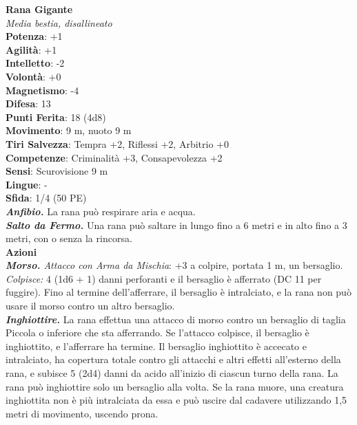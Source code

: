 \begin{multicols}{2}
\medskip\textbf{Rana Gigante}\\
\emph{Media bestia, disallineato}\\
\textbf{Potenza}: +1\\
\textbf{Agilità}: +1\\
\textbf{Intelletto}: -2\\
\textbf{Volontà}: +0\\
\textbf{Magnetismo}: -4\\
\textbf{Difesa}: 13\\
\textbf{Punti Ferita}: 18 (4d8)\\
\textbf{Movimento}: 9 m, nuoto 9 m\\
\textbf{Tiri Salvezza}: Tempra +2, Riflessi +2, Arbitrio +0 \\
\textbf{Competenze}: Criminalità +3, Consapevolezza +2\\
\textbf{Sensi}: Scurovisione 9 m\\
\textbf{Lingue}: -\\
\textbf{Sfida}: 1/4 (50 PE)\smallskip\\
\emph{\textbf{Anfibio.}} La rana può respirare aria e acqua.\\
\emph{\textbf{Salto da Fermo.}} Una rana può saltare in lungo fino a 6 metri e in alto fino a 3 metri, con o senza la rincorsa.\\
\smallskip\textbf{Azioni}\\
\emph{\textbf{Morso.} Attacco con Arma da Mischia}: +3 a colpire, portata 1 m, un bersaglio.\\
\emph{Colpisce:} 4 (1d6 + 1) danni perforanti e il bersaglio è afferrato (DC 11 per fuggire). Fino al termine dell'afferrare, il bersaglio è intralciato, e la rana non può usare il morso contro un altro bersaglio.\\
\emph{\textbf{Inghiottire.}} La rana effettua una attacco di morso contro un bersaglio di taglia Piccola o inferiore che sta afferrando. Se l'attacco colpisce, il bersaglio è inghiottito, e l'afferrare ha termine. Il bersaglio inghiottito è accecato e intralciato, ha copertura totale contro gli attacchi e altri effetti all'esterno della rana, e subisce 5 (2d4) danni da acido all'inizio di ciascun turno della rana. La rana può inghiottire solo un bersaglio alla volta. Se la rana muore, una creatura inghiottita non è più intralciata da essa e può uscire dal cadavere utilizzando 1,5 metri di movimento, uscendo prona.\\


\end{multicols}
